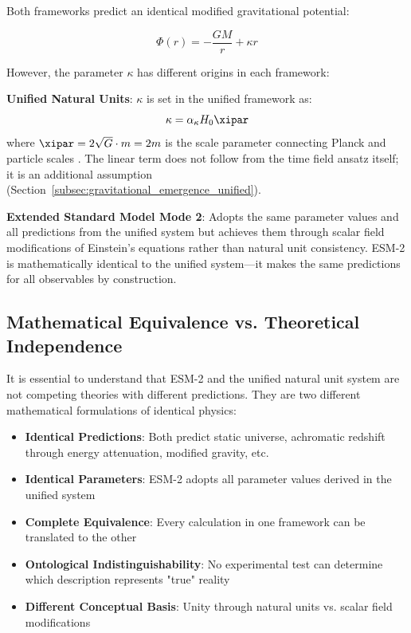 	Both frameworks predict an identical modified gravitational potential:
	
	\begin{equation}
		\Phi(r) = -\frac{GM}{r} + \kappa r
	\end{equation}
	
	However, the parameter $\kappa$ has different origins in each framework:
	
	\textbf{Unified Natural Units}: $\kappa$ is set in the unified framework as:
	\begin{equation}
		\kappa = \alpha_\kappa H_0 \xipar
	\end{equation}
	where $\xipar = 2\sqrt{G} \cdot m = 2m$ is the scale parameter connecting Planck and particle scales \cite{pascher_beta_derivation_2025}. The linear term does not follow from the time field ansatz itself; it is an additional assumption (Section~\ref{subsec:gravitational_emergence_unified}).
	
	\textbf{Extended Standard Model Mode 2}: Adopts the same parameter values and all predictions from the unified system but achieves them through scalar field modifications of Einstein's equations rather than natural unit consistency. ESM-2 is mathematically identical to the unified system—it makes the same predictions for all observables by construction.
	
	\subsection{Mathematical Equivalence vs. Theoretical Independence}
	\label{subsec:equivalence_vs_independence}
	
	It is essential to understand that ESM-2 and the unified natural unit system are not competing theories with different predictions. They are two different mathematical formulations of identical physics:
	
	\begin{itemize}
		\item \textbf{Identical Predictions}: Both predict static universe, achromatic redshift through energy attenuation, modified gravity, etc.
		\item \textbf{Identical Parameters}: ESM-2 adopts all parameter values derived in the unified system
		\item \textbf{Complete Equivalence}: Every calculation in one framework can be translated to the other
		\item \textbf{Ontological Indistinguishability}: No experimental test can determine which description represents "true" reality \cite{vanFraassen1980}
		\item \textbf{Different Conceptual Basis}: Unity through natural units vs. scalar field modifications
	\end{itemize}
	
